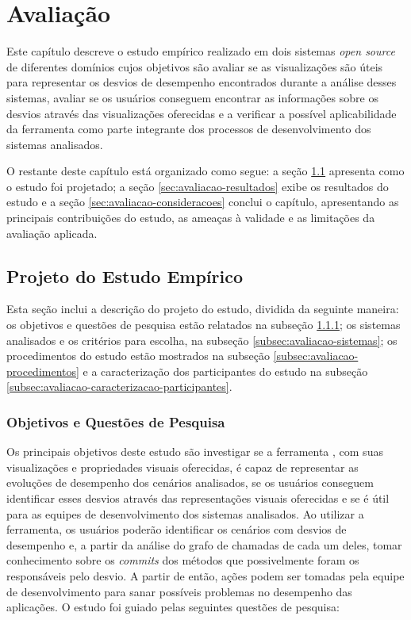 \chapter{Avaliação} \label{ch:avaliacao}

Este capítulo descreve o estudo empírico realizado em dois sistemas \textit{open source} de diferentes domínios cujos objetivos são avaliar se as visualizações são úteis para representar os desvios de desempenho encontrados durante a análise desses sistemas, avaliar se os usuários conseguem encontrar as informações sobre os desvios através das visualizações oferecidas e a verificar a possível aplicabilidade da ferramenta como parte integrante dos processos de desenvolvimento dos sistemas analisados.

O restante deste capítulo está organizado como segue: a seção \ref{sec:avaliacao-projeto} apresenta como o estudo foi projetado; a seção \ref{sec:avaliacao-resultados} exibe os resultados do estudo e a seção \ref{sec:avaliacao-consideracoes} conclui o capítulo, apresentando as principais contribuições do estudo, as ameaças à validade e as limitações da avaliação aplicada.

\section{Projeto do Estudo Empírico} \label{sec:avaliacao-projeto}

Esta seção inclui a descrição do projeto do estudo, dividida da seguinte maneira: os objetivos e questões de pesquisa estão relatados na subseção \ref{subsec:avaliacao-objetivos-questoes-pesquisa}; os sistemas analisados e os critérios para escolha, na subseção \ref{subsec:avaliacao-sistemas}; os procedimentos do estudo estão mostrados na subseção \ref{subsec:avaliacao-procedimentos} e a caracterização dos participantes do estudo na subseção \ref{subsec:avaliacao-caracterizacao-participantes}.

\subsection{Objetivos e Questões de Pesquisa} \label{subsec:avaliacao-objetivos-questoes-pesquisa}

Os principais objetivos deste estudo são investigar se a ferramenta \textit{\toolName}, com suas visualizações e propriedades visuais oferecidas, é capaz de representar as evoluções de desempenho dos cenários analisados, se os usuários conseguem identificar esses desvios através das representações visuais oferecidas e se é útil para as equipes de desenvolvimento dos sistemas analisados. Ao utilizar a ferramenta, os usuários poderão identificar os cenários com desvios de desempenho e, a partir da análise do grafo de chamadas de cada um deles, tomar conhecimento sobre os \textit{commits} dos métodos que possivelmente foram os responsáveis pelo desvio. A partir de então, ações podem ser tomadas pela equipe de desenvolvimento para sanar possíveis problemas no desempenho das aplicações. O estudo foi guiado pelas seguintes questões de pesquisa:

